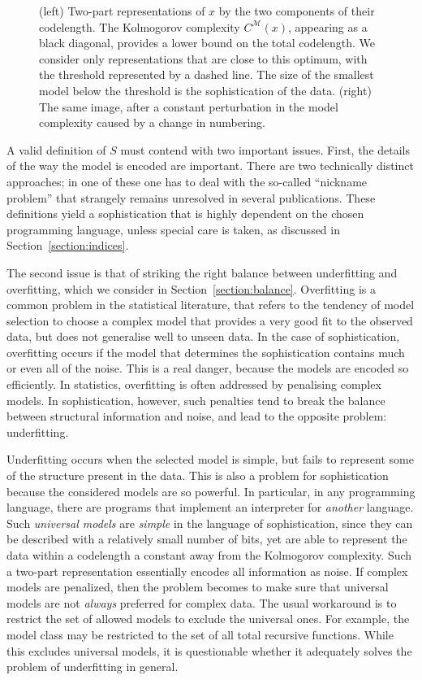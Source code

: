 \documentclass{style/llncs}
\newcommand{\M}{\mathscr M}
\begin{document}
\begin{figure}[tb]
\begin{minipage}{0.45\textwidth}
  \end{minipage}
  \caption{\small (left) Two-part representations of $x$ by the two components of their codelength. The Kolmogorov complexity $C^\M(x)$, appearing as a black diagonal, provides a lower bound on the total codelength. We consider only representations that are close to this optimum, with the threshold represented by a dashed line. The size of the smallest model below the threshold is the sophistication of the data. (right) The same image, after a constant perturbation in the model complexity caused by a change in numbering.}
  \label{fig:diagram}
\end{figure}

A valid definition of $S$ must contend with two important issues. First, the details of the way the model is encoded are important. There are two technically distinct approaches; in one of these one has to deal with the so-called ``nickname problem'' that strangely remains unresolved in several publications. These definitions yield a sophistication that is highly dependent on the chosen programming language, unless special care is taken, as discussed in Section~\ref{section:indices}.

The second issue is that of striking the right balance between underfitting and overfitting, which we consider in Section~\ref{section:balance}. Overfitting is a common problem in the statistical literature, that refers to the tendency of model selection to choose a complex model that provides a very good fit to the observed data, but does not generalise well to unseen data. In the case of sophistication, overfitting occurs if the model that determines the sophistication contains much or even all of the noise. This is a real danger, because the models are encoded so efficiently. In statistics, overfitting is often addressed by penalising complex models. In sophistication, however, such penalties tend to break the balance between structural information and noise, and lead to the opposite problem: underfitting.

Underfitting occurs when the selected model is simple, but fails to represent some of the structure present in the data. This is also a problem for sophistication because the considered models are so powerful. In particular, in any programming language, there are programs that implement an interpreter for \emph{another} language. Such \emph{universal models} are \emph{simple} in the language of sophistication, since they can be described with a relatively small number of bits, yet are able to represent the data within a codelength a constant away from the Kolmogorov complexity. Such a two-part representation essentially encodes all information as noise. If complex models are penalized, then the problem becomes to make sure that universal models are not \emph{always} preferred for complex data. The usual workaround is to restrict the set of allowed models to exclude the universal ones. For example, the model class may be restricted to the set of all total recursive functions. While this excludes universal models, it is questionable whether it adequately solves the problem of underfitting in general.
\end{document}
